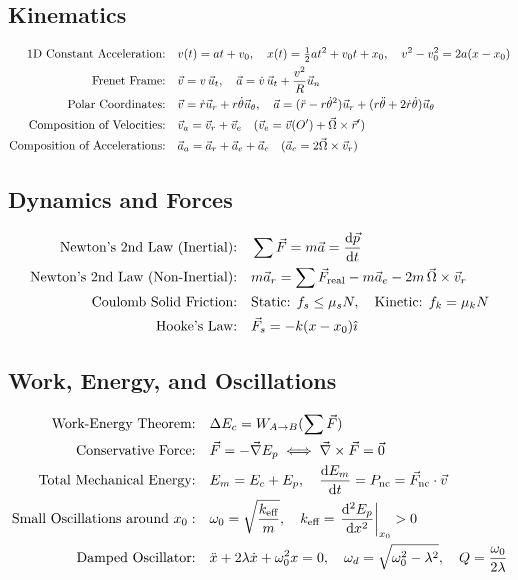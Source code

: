 \subsection{Kinematics}
\begin{align*}
\text{1D Constant Acceleration:}\quad & v(t) = at + v_0, \quad x(t) = \tfrac{1}{2}at^2 + v_0 t + x_0, \quad v^2 - v_0^2 = 2a(x - x_0) \\
\text{Frenet Frame:}\quad & \vec{v} = v\,\vec{u}_t, \quad \vec{a} = \dot{v}\,\vec{u}_t + \frac{v^2}{R}\vec{u}_n \\
\text{Polar Coordinates:}\quad & \vec{v} = \dot{r}\vec{u}_r + r\dot{\theta}\vec{u}_\theta, \quad \vec{a} = (\ddot{r} - r\dot{\theta}^2)\vec{u}_r + (r\ddot{\theta} + 2\dot{r}\dot{\theta})\vec{u}_\theta \\
\text{Composition of Velocities:}\quad & \vec{v}_a = \vec{v}_r + \vec{v}_e \quad (\vec{v}_e = \vec{v}(O') + \vec{\Omega}\times\vec{r}') \\
\text{Composition of Accelerations:}\quad & \vec{a}_a = \vec{a}_r + \vec{a}_e + \vec{a}_c \quad (\vec{a}_c = 2\vec{\Omega}\times\vec{v}_r)
\end{align*}

\subsection{Dynamics and Forces}
\begin{align*}
\text{Newton's 2nd Law (Inertial):}\quad & \sum\vec{F} = m\vec{a} = \frac{\mathrm{d}\vec{p}}{\mathrm{d} t} \\
\text{Newton's 2nd Law (Non-Inertial):}\quad & m\vec{a}_r = \sum\vec{F}_{\text{real}} - m\vec{a}_e - 2m\,\vec{\Omega}\times\vec{v}_r \\
\text{Coulomb Solid Friction:}\quad & \text{Static: } f_s \le \mu_s N, \quad \text{Kinetic: } f_k = \mu_k N \\
\text{Hooke's Law:}\quad & \vec{F}_s = -k(x - x_0)\hat{\imath}
\end{align*}

\subsection{Work, Energy, and Oscillations}
\begin{align*}
\text{Work-Energy Theorem:}\quad & \Delta E_c = W_{A\to B}(\sum\vec{F}) \\
\text{Conservative Force:}\quad & \vec{F} = -\vec{\nabla} E_p \iff \vec{\nabla}\times\vec{F} = \vec{0} \\
\text{Total Mechanical Energy:}\quad & E_m = E_c + E_p, \quad \frac{\mathrm{d} E_m}{\mathrm{d} t} = P_{\text{nc}} = \vec{F}_{\text{nc}}\cdot\vec{v} \\
\text{Small Oscillations around } x_0:\quad & \omega_0 = \sqrt{\frac{k_{\text{eff}}}{m}}, \quad k_{\text{eff}} = \left.\frac{\mathrm{d}^2 E_p}{\mathrm{d} x^2}\right|_{x_0} > 0 \\
\text{Damped Oscillator:}\quad & \ddot{x} + 2\lambda\dot{x} + \omega_0^2 x = 0, \quad \omega_d = \sqrt{\omega_0^2 - \lambda^2}, \quad Q = \frac{\omega_0}{2\lambda}
\end{align*}

